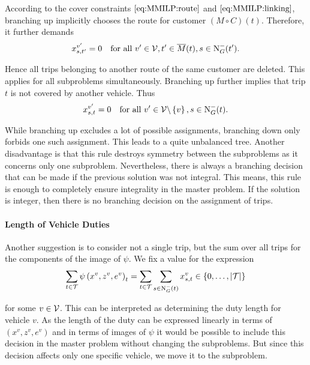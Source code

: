 According to the cover constraints $\eqref{eq:MMILP:route}$ and $\eqref{eq:MMILP:linking}$, branching up implicitly chooses the route for customer $(M\circ C)(t)$. Therefore, it further demands
\begin{align*}
	x^{v'}_{s,t'} = 0 && \text{for all } v'\in\mathcal{V}, t'\in\overline{M}(t), s\in\operatorname{N}_G^-(t').
\end{align*}

Hence all trips belonging to another route of the same customer are deleted. This applies for all subproblems simultaneously. Branching up further implies that trip $t$ is not covered by another vehicle. Thus
\begin{align*}
	x^{v'}_{s,t} = 0 && \text{for all } v'\in\mathcal{V}\backslash\left\{v\right\}, s\in\operatorname{N}_G^-(t).
\end{align*}

While branching up excludes a lot of possible assignments, branching down only forbids one such assignment. This leads to a quite unbalanced tree. Another disadvantage is that this rule destroys symmetry between the subproblems as it concerns only one subproblem. Nevertheless, there is always a branching decision that can be made if the previous solution was not integral. This means, this rule is enough to completely ensure integrality in the master problem. If the solution is integer, then there is no branching decision on the assignment of trips.

\paragraph{Length of Vehicle Duties} \parfill

Another suggestion is to consider not a single trip, but the sum over all trips for the components of the image of $\psi$. We fix a value for the expression
\begin{align*}
	\sum_{t\in\mathcal{T}}\psi\left(x^v,z^v,e^v\right)_t = \sum_{t\in\mathcal{T}} \sum_{s\in\operatorname{N}_G^-(t)} x^v_{s,t} \in\left\{0,\dots,\vert\mathcal{T}\vert\right\}
\end{align*}

for some $v\in\mathcal{V}$. This can be interpreted as determining the duty length for vehicle $v$. As the length of the duty can be expressed linearly in terms of $\left(x^v,z^v,e^v\right)$ and in terms of images of $\psi$ it would be possible to include this decision in the master problem without changing the subproblems. But since this decision affects only one specific vehicle, we move it to the subproblem.

